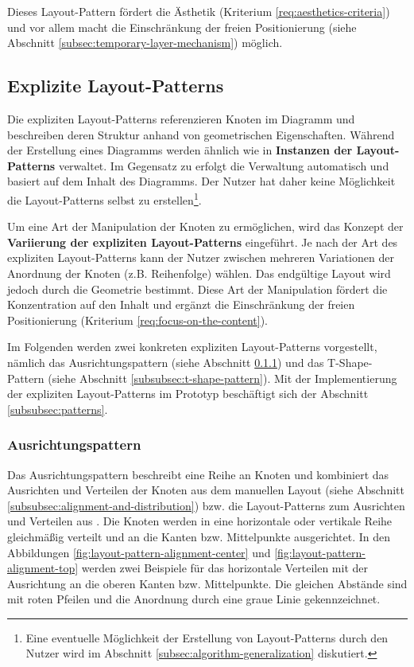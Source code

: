 Dieses Layout-Pattern fördert die Ästhetik (Kriterium \ref{req:aesthetics-criteria}) und vor allem macht die Einschränkung der freien Positionierung (siehe Abschnitt \ref{subsec:temporary-layer-mechanism}) möglich.

\subsection{Explizite Layout-Patterns}
\label{subsec:explicit-layout-patterns}

Die expliziten Layout-Patterns referenzieren Knoten im Diagramm und beschreiben deren Struktur anhand von geometrischen Eigenschaften. Während der Erstellung eines Diagramms werden ähnlich wie in \cite{Maier12A-Pattern-based} \textbf{Instanzen der Layout-Patterns} verwaltet. Im Gegensatz zu \cite{Maier12A-Pattern-based} erfolgt die Verwaltung automatisch und basiert auf dem Inhalt des Diagramms. Der Nutzer hat daher keine Möglichkeit die Layout-Patterns selbst zu erstellen\footnote{Eine eventuelle Möglichkeit der Erstellung von Layout-Patterns durch den Nutzer wird im Abschnitt \ref{subsec:algorithm-generalization} diskutiert.}.

Um eine Art der Manipulation der Knoten zu ermöglichen, wird das Konzept der \textbf{Variierung der expliziten Layout-Patterns} eingeführt. Je nach der Art des expliziten Layout-Patterns kann der Nutzer zwischen mehreren Variationen der Anordnung der Knoten (z.B. Reihenfolge) wählen. Das endgültige Layout wird jedoch durch die Geometrie bestimmt. Diese Art der Manipulation fördert die Konzentration auf den Inhalt und ergänzt die Einschränkung der freien Positionierung (Kriterium \ref{req:focus-on-the-content}).

Im Folgenden werden zwei konkreten expliziten Layout-Patterns vorgestellt, nämlich das Ausrichtungspattern (siehe Abschnitt \ref{subsubsec:alignment-pattern}) und das T-Shape-Pattern (siehe Abschnitt \ref{subsubsec:t-shape-pattern}). Mit der Implementierung der expliziten Layout-Patterns im Prototyp beschäftigt sich der Abschnitt \ref{subsubsec:patterns}.

\subsubsection{Ausrichtungspattern}
\label{subsubsec:alignment-pattern}

Das Ausrichtungspattern beschreibt eine Reihe an Knoten und kombiniert das Ausrichten und Verteilen der Knoten aus dem manuellen Layout (siehe Abschnitt \ref{subsubsec:alignment-and-distribution}) bzw. die Layout-Patterns zum Ausrichten und Verteilen aus \cite[S.143ff und S.136ff]{Maier12A-Pattern-based}. Die Knoten werden in eine horizontale oder vertikale Reihe gleichmäßig verteilt und an die Kanten bzw. Mittelpunkte ausgerichtet. In den Abbildungen \ref{fig:layout-pattern-alignment-center} und \ref{fig:layout-pattern-alignment-top} werden zwei Beispiele für das horizontale Verteilen mit der Ausrichtung an die oberen Kanten bzw. Mittelpunkte. Die gleichen Abstände sind mit roten Pfeilen und die Anordnung durch eine graue Linie gekennzeichnet.

